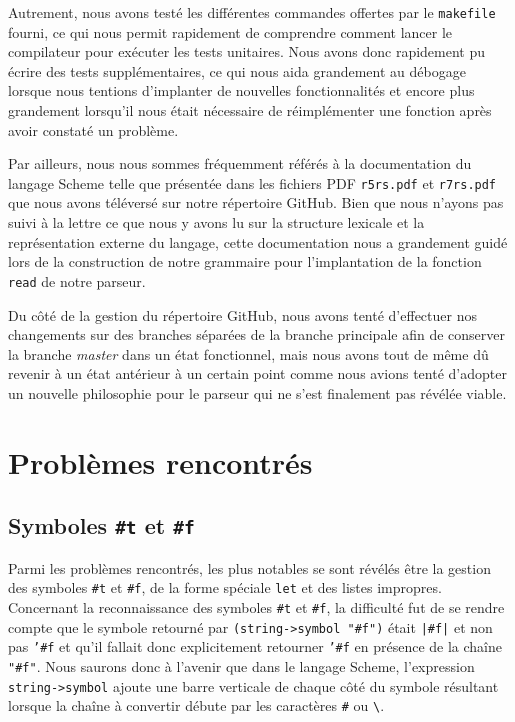\documentclass[12pt]{article}
\begin{document}
Autrement, nous avons testé les différentes commandes offertes par le \texttt{makefile} fourni, ce qui nous permit rapidement de comprendre comment lancer le compilateur pour exécuter les tests unitaires. Nous avons donc rapidement pu écrire des tests supplémentaires, ce qui nous aida grandement au débogage lorsque nous tentions d'implanter de nouvelles fonctionnalités et encore plus grandement lorsqu'il nous était nécessaire de réimplémenter une fonction après avoir constaté un problème.

Par ailleurs, nous nous sommes fréquemment référés à la documentation du langage Scheme telle que présentée dans les fichiers PDF \texttt{r5rs.pdf} et \texttt{r7rs.pdf} que nous avons téléversé sur notre répertoire GitHub. Bien que nous n'ayons pas suivi à la lettre ce que nous y avons lu sur la structure lexicale et la représentation externe du langage, cette documentation nous a grandement guidé lors de la construction de notre grammaire pour l'implantation de la fonction \texttt{read} de notre parseur.

Du côté de la gestion du répertoire GitHub, nous avons tenté d'effectuer nos changements sur des branches séparées de la branche principale afin de conserver la branche \textit{master} dans un état fonctionnel, mais nous avons tout de même dû revenir à un état antérieur à un certain point comme nous avions tenté d'adopter un nouvelle philosophie pour le parseur qui ne s'est finalement pas révélée viable.

\section{Problèmes rencontrés}

\subsection{Symboles \texttt{\#t} et \texttt{\#f}}
Parmi les problèmes rencontrés, les plus notables se sont révélés être la gestion des symboles \texttt{\#t} et \texttt{\#f}, de la forme spéciale \texttt{let} et des listes impropres. Concernant la reconnaissance des symboles \texttt{\#t} et \texttt{\#f}, la difficulté fut de se rendre compte que le symbole retourné par \texttt{(string->symbol "\#f")} était \texttt{|\#f|} et non pas \texttt{'\#f} et qu'il fallait donc explicitement retourner \texttt{'\#f} en présence de la chaîne \texttt{"\#f"}. Nous saurons donc à l'avenir que dans le langage Scheme, l'expression \texttt{string->symbol} ajoute une barre verticale de chaque côté du symbole résultant lorsque la chaîne à convertir débute par les caractères \texttt{\#} ou \texttt{\textbackslash}.
\end{document}
